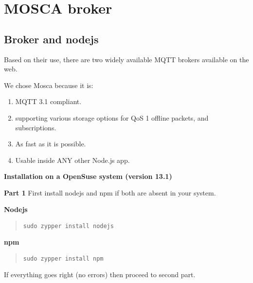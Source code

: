 \documentclass[16pt]{article}
\begin{document}
\vspace{13cm}

\section{MOSCA broker}

\vspace{0.5cm}
\subsection{Broker and nodejs}

\vspace{0.5cm}

Based on their use, there are two widely available MQTT brokers
available on the web.
\begin{enumerate}
	{} 
	{}
\end{enumerate}
We chose Mosca because it is: 

\begin{enumerate}
	
	\item MQTT 3.1 compliant.
	\item supporting various storage options for QoS 1 offline packets, and subscriptions.
	\item As fast as it is possible.
	\item Usable inside ANY other Node.js app.
	
\end{enumerate}
\vspace{0.5cm}




\textbf{Installation on a OpenSuse system (version
	13.1)}

\textbf{Part 1} First install nodejs and npm if both are absent in your
system.


\textbf{Nodejs}

\begin{quote}
	\texttt{sudo zypper install nodejs}
\end{quote}

\textbf{npm}

\begin{quote}
	\texttt{sudo zypper install npm}
\end{quote}

If everything goes right (no errors) then proceed to second part.
\vspace{0.5cm}
\end{document}
